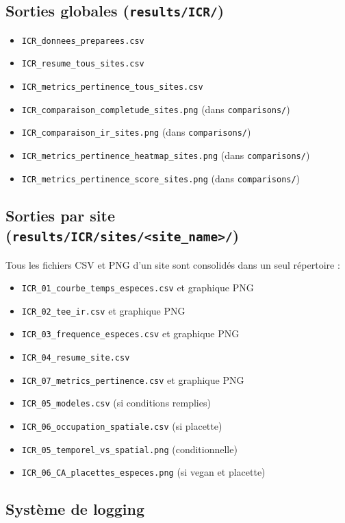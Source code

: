 \documentclass[11pt,a4paper]{article}
\begin{document}
\subsection{Sorties globales (\texttt{results/ICR/})}
\begin{itemize}
  \item \texttt{ICR\_donnees\_preparees.csv}
  \item \texttt{ICR\_resume\_tous\_sites.csv}
  \item \texttt{ICR\_metrics\_pertinence\_tous\_sites.csv}
  \item \texttt{ICR\_comparaison\_completude\_sites.png} (dans \texttt{comparisons/})
  \item \texttt{ICR\_comparaison\_ir\_sites.png} (dans \texttt{comparisons/})
  \item \texttt{ICR\_metrics\_pertinence\_heatmap\_sites.png} (dans \texttt{comparisons/})
  \item \texttt{ICR\_metrics\_pertinence\_score\_sites.png} (dans \texttt{comparisons/})
\end{itemize}

\subsection{Sorties par site (\texttt{results/ICR/sites/<site\_name>/})}
Tous les fichiers CSV et PNG d'un site sont consolidés dans un seul répertoire :
\begin{itemize}
  \item \texttt{ICR\_01\_courbe\_temps\_especes.csv} et graphique PNG
  \item \texttt{ICR\_02\_tee\_ir.csv} et graphique PNG
  \item \texttt{ICR\_03\_frequence\_especes.csv} et graphique PNG
  \item \texttt{ICR\_04\_resume\_site.csv}
  \item \texttt{ICR\_07\_metrics\_pertinence.csv} et graphique PNG
  \item \texttt{ICR\_05\_modeles.csv} (si conditions remplies)
  \item \texttt{ICR\_06\_occupation\_spatiale.csv} (si placette)
  \item \texttt{ICR\_05\_temporel\_vs\_spatial.png} (conditionnelle)
  \item \texttt{ICR\_06\_CA\_placettes\_especes.png} (si vegan et placette)
\end{itemize}

\subsection{Système de logging}
\end{document}
